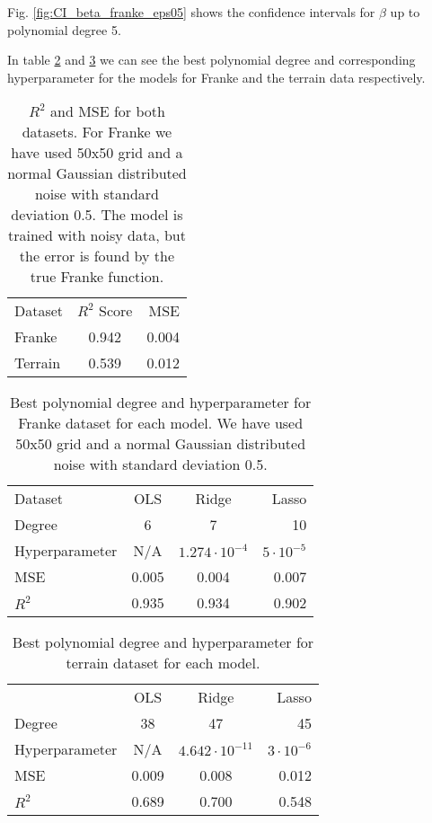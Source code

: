 \documentclass[%
 reprint,
nofootinbib,
 amsmath,amssymb,
 aps,
]{revtex4-2}
\begin{document}
Fig. \ref{fig:CI_beta_franke_eps05} shows the confidence intervals for $\beta$ up to polynomial degree 5.


In table \ref{tab:best_p_franke} and \ref{tab:best_p_terrain} we can see the best polynomial degree and corresponding hyperparameter for the models for Franke and the terrain data respectively.


\begin{table}[b]
\caption{\label{tab:R2_MSE}%
$R^2$ and MSE for both datasets. For Franke we have used 50x50 grid and a normal Gaussian distributed noise with standard deviation 0.5. The model is trained with noisy data, but the error is found by the true Franke function.
}
\begin{ruledtabular}
\begin{tabular}{lcr}
\textrm{Dataset}&
\multicolumn{1}{c}{\textrm{$R^2$ Score}}&
\textrm{MSE}\\
\colrule
Franke  & 0.942 & 0.004\\
Terrain & 0.539 & 0.012\\
\end{tabular}
\end{ruledtabular}
\end{table}

\begin{table}[b]
\caption{\label{tab:best_p_franke}%
Best polynomial degree and hyperparameter for Franke dataset for each model. We have used 50x50 grid and a normal Gaussian distributed noise with standard deviation 0.5.
}
\begin{ruledtabular}
\begin{tabular}{lccr}
\textrm{Dataset}&
\multicolumn{1}{c}{\textrm{OLS}}&
\multicolumn{1}{c}{\textrm{Ridge}}&
\textrm{Lasso}\\
\colrule
Degree & 6 & 7 & 10 \\
Hyperparameter & N/A & $1.274 \cdot 10^{-4}$ & $5 \cdot 10^{-5}$ \\
MSE & 0.005 & 0.004 & 0.007  \\
$R^2$ & 0.935 & 0.934 & 0.902 \\
\end{tabular}
\end{ruledtabular}
\end{table}

\begin{table}[b]
\caption{\label{tab:best_p_terrain}%
Best polynomial degree and hyperparameter for terrain dataset for each model.
}
\begin{ruledtabular}
\begin{tabular}{lccr}
\textrm{}&
\multicolumn{1}{c}{\textrm{OLS}}&
\multicolumn{1}{c}{\textrm{Ridge}}&
\textrm{Lasso}\\
\colrule
Degree  & 38 & 47 & 45 \\
Hyperparameter & N/A & $4.642 \cdot 10^{-11}$ & $3 \cdot 10^{-6}$  \\
MSE & 0.009 & 0.008 & 0.012 \\
$R^2$ & 0.689 & 0.700& 0.548\\
\end{tabular}
\end{ruledtabular}
\end{table}
\end{document}
